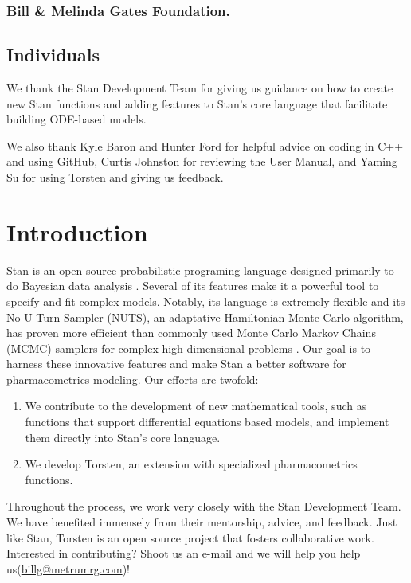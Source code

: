 \documentclass[11pt, reqno]{amsbook}
\numberwithin{section}{chapter}
\theoremstyle{remark}
\begin{document}
\subsection*{Bill \& Melinda Gates Foundation.}
\label{sec:org4f260f5}
\section*{Individuals}
\label{sec:org6d04512}
We thank the Stan Development Team for giving us guidance on how to
create new Stan functions and adding features to Stan's core language
that facilitate building ODE-based models.

We also thank Kyle Baron and Hunter Ford for helpful advice on coding
in C++ and using GitHub, Curtis Johnston for reviewing the User
Manual, and Yaming Su for using Torsten and giving us feedback.

\chapter{Introduction}
\label{sec:org49a4bfe}
Stan is an open source probabilistic programing language designed
primarily to do Bayesian data analysis \cite{carpenter17_stan}. Several of its
features make it a powerful tool to specify and fit complex
models. Notably, its language is extremely flexible and its No U-Turn
Sampler (NUTS), an adaptative Hamiltonian Monte Carlo algorithm, has
proven more efficient than commonly used Monte Carlo Markov Chains
(MCMC) samplers for complex high dimensional problems \cite{hoffman_no-u-turn_2011}. Our
goal is to harness these innovative features and make Stan a better
software for pharmacometrics modeling. Our efforts are twofold:
\begin{enumerate}
\item We contribute to the development of new mathematical tools, such as functions that support differential equations based models, and implement them directly into Stan's core language.
\item We develop Torsten, an extension with specialized pharmacometrics functions.
\end{enumerate}

Throughout the process, we work very closely with the Stan Development
Team. We have benefited immensely from their mentorship, advice, and
feedback. Just like Stan, Torsten is an open source project that
fosters collaborative work. Interested in contributing? Shoot us an
e-mail and we will help you help us(\href{mailto:billg@metrumrg.com}{billg@metrumrg.com})!
\end{document}
